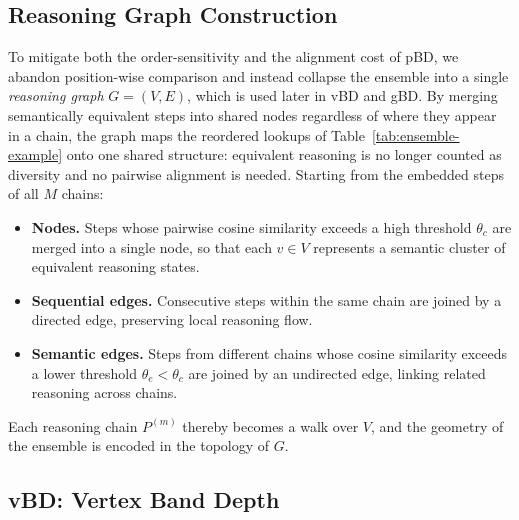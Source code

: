 \documentclass[letterpaper]{article} %
\begin{document}
\subsection{Reasoning Graph Construction}
\label{sec:method:graph}

To mitigate both the order-sensitivity and the alignment cost of pBD, we abandon
position-wise comparison and instead collapse the ensemble into a single
\emph{reasoning graph} $G = (V, E)$, which is used later in vBD and gBD. By merging
semantically equivalent steps into shared nodes regardless of where they appear
in a chain, the graph maps the reordered lookups of
Table~\ref{tab:ensemble-example} onto one shared structure: equivalent reasoning
is no longer counted as diversity and no pairwise alignment is needed. Starting from the embedded steps of all $M$
chains:
\begin{itemize}
  \item \textbf{Nodes.} Steps whose pairwise cosine similarity exceeds a high
        threshold $\theta_c$ are merged into a single node, so that each
        $v \in V$ represents a semantic cluster of equivalent reasoning states.
  \item \textbf{Sequential edges.} Consecutive steps within the same chain are
        joined by a directed edge, preserving local reasoning flow.
  \item \textbf{Semantic edges.} Steps from different chains whose cosine
        similarity exceeds a lower threshold $\theta_e < \theta_c$ are joined by
        an undirected edge, linking related reasoning across chains.
\end{itemize}
Each reasoning chain $P^{(m)}$ thereby becomes a walk over $V$, and the geometry
of the ensemble is encoded in the topology of $G$.

\subsection{vBD: Vertex Band Depth}
\label{sec:method:vbd}
\end{document}
